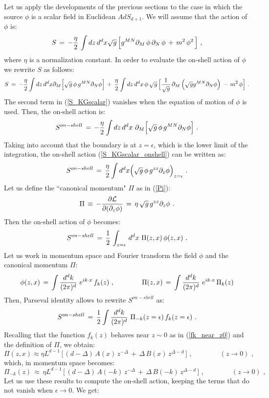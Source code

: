 \documentclass[12pt,notitlepage,a4paper]{article}
\newcommand{\beq}{\begin{equation}}
\newcommand{\eeq}{\end{equation}}
\begin{document}
Let us apply the developments of the previous sections to the case in which the source $\phi$ is a scalar field in Euclidean $AdS_{d+1}$. We will assume that  the action of $\phi$ is:
\beq
S\,=\,-{\eta\over 2}\,\int dz\,d^d x\sqrt{g}\,\Big[
g^{MN}\partial_M\,\phi\,\partial_N\,\phi\,+\,m^2\,\phi^2\,\Big]\,\,,
\eeq
where $\eta$ is a normalization constant. In order to evaluate the on-shell action of $\phi$ we rewrite $S$ as follows:
\beq
S\,=\,-{\eta\over 2}\int dz\,d^d x \partial_{M} 
\Big[ \sqrt{g}\, \phi\, g^{MN}\partial_N\phi\Big]\,+\,
{\eta\over 2}\int dz\,d^d x\,\phi\,\sqrt{g}\,\Big[
{1\over \sqrt{g}}\,\partial_M\,\Big( \sqrt{g} g^{MN}\partial_N\phi\Big)\,-\,m^2\,\phi
\Big]\,\,.
\label{S_KGscalar}
\eeq
The second term  in (\ref{S_KGscalar}) vanishes when the equation of motion of $\phi$ is used. Then, the on-shell action is:
\beq
S^{on-shell}\,=\,-{\eta\over 2}\int dz\,d^d x \,\,\partial_{M} 
\Big[ \sqrt{g}\, \phi\, g^{MN}\partial_N\phi\Big]\,\,.
\label{S_KGscalar_onshell}
\eeq
Taking into account that the boundary is at $z=\epsilon$, which is the lower limit of the integration, the on-shell action (\ref{S_KGscalar_onshell}) can be written as:
\beq
S^{on-shell}\,=\,{\eta\over 2}\int d^d x \Big(\sqrt{g}\, \phi\, g^{zz}\partial_z\phi\Big)_{z=\epsilon}\,\,.
\eeq
Let us define the ``canonical momentum" $\Pi$ as in (\ref{Pi}):
\beq
\Pi\,\equiv\,-{\partial {\cal L}\over \partial (\partial_{z} \phi)}\,=\,
\eta\,\sqrt{g}\, g^{zz}\partial_z\phi\,\,.
\eeq
Then the on-shell action of $\phi$ becomes:
\beq
S^{on-shell}\,=\,{1\over 2}\,\int_{z=\epsilon}\,d^d x \,\,
\Pi(z,x)\,\phi(z,x)\,\,.
\eeq
Let us work in momentum space and  Fourier transform the field $\phi$ and the  canonical momentum $\Pi$:
\beq
\phi(z,x)\,=\,\int {d^dk\over (2\pi)^d}\,\,
e^{ik\cdot x}\, f_k(z)\,\,,
\qquad\qquad
\Pi(z,x)\,=\,\int {d^dk\over (2\pi)^d}\,\,
e^{ik\cdot x}\, \Pi_k(z)
\eeq
Then, Parseval identity allows to rewrite $S^{on-shell}$ as:
\beq
S^{on-shell}\,=\,{1\over 2}\int {d^dk\over (2\pi)^d}\,\,
\Pi_{-k}(z=\epsilon)\,f_k(z=\epsilon)\,\,.
\eeq
Recalling  that  the function $f_k(z)$ behaves near $z\sim 0$ as in (\ref{fk_near_z0}) and the definition of $\Pi$, we obtain:
\beq
\Pi(z,x)\approx\eta L^{d-1}\,
\Big[\,(d-\Delta)\,A(x)\,z^{-\Delta}\,+\,\Delta\, B(x)\, z^{\Delta-d}\,\Big]\,\,,
\qquad\qquad
(z\to 0)\,\,,
\eeq
which, in momentum space becomes:
\beq
\Pi_{-k}(z)\,\approx\,\eta L^{d-1}\,
\Big[\,(d-\Delta)\,A(-k)\,z^{-\Delta}\,+\,\Delta\, B(-k)\, z^{\Delta-d}\,\Big]\,\,,
\qquad\qquad
(z\to 0)\,\,,
\eeq
Let us use these results to compute the on-shell action, keeping the terms that do not vanish when $\epsilon\to 0$. We get:
\end{document}
